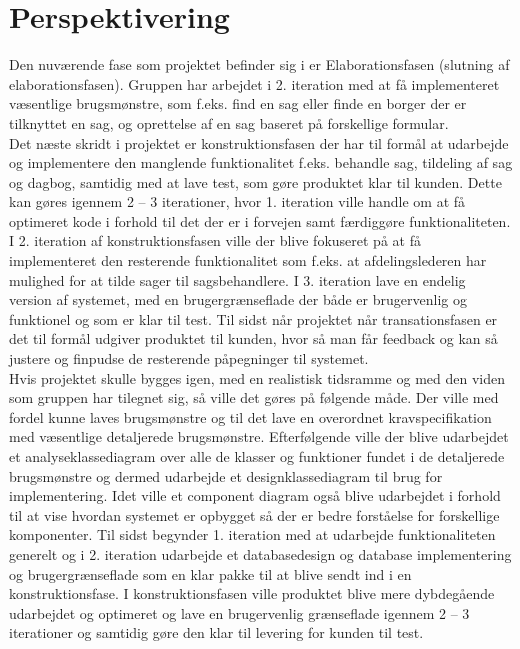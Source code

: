 \chapter{Perspektivering}
Den nuværende fase som projektet befinder sig i er Elaborationsfasen (slutning af elaborationsfasen). Gruppen har arbejdet i 2. iteration med at få implementeret væsentlige brugsmønstre, som f.eks. find en sag eller finde en borger der er tilknyttet en sag, og oprettelse af en sag baseret på forskellige formular. \\
Det næste skridt i projektet er konstruktionsfasen der har til formål at udarbejde og implementere den manglende funktionalitet f.eks. behandle sag, tildeling af sag og dagbog, samtidig med at lave test, som gøre produktet klar til kunden. Dette kan gøres igennem 2 – 3 iterationer, hvor 1. iteration ville handle om at få optimeret kode i forhold til det der er i forvejen samt færdiggøre funktionaliteten. I 2. iteration af konstruktionsfasen ville der blive fokuseret på at få implementeret den resterende funktionalitet som f.eks. at afdelingslederen har mulighed for at tilde sager til sagsbehandlere. I 3. iteration lave en endelig version af systemet, med en brugergrænseflade der både er brugervenlig og funktionel og som er klar til test. Til sidst når projektet når transationsfasen er det til formål udgiver produktet til kunden, hvor så man får feedback og kan så justere og finpudse de resterende påpegninger til systemet. \\
Hvis projektet skulle bygges igen, med en realistisk tidsramme og med den viden som gruppen har tilegnet sig, så ville det gøres på følgende måde. Der ville med fordel kunne laves brugsmønstre og til det lave en overordnet kravspecifikation med væsentlige detaljerede brugsmønstre. Efterfølgende ville der blive udarbejdet et analyseklassediagram over alle de klasser og funktioner fundet i de detaljerede brugsmønstre og dermed udarbejde et designklassediagram til brug for implementering. Idet ville et component diagram også blive udarbejdet i forhold til at vise hvordan systemet er opbygget så der er bedre forståelse for forskellige komponenter. Til sidst begynder 1. iteration med at udarbejde funktionaliteten generelt og i 2. iteration udarbejde et databasedesign og database implementering og brugergrænseflade som en klar pakke til at blive sendt ind i en konstruktionsfase. I konstruktionsfasen ville produktet blive mere dybdegående udarbejdet og optimeret og lave en brugervenlig grænseflade igennem 2 – 3 iterationer og samtidig gøre den klar til levering for kunden til test. \\

